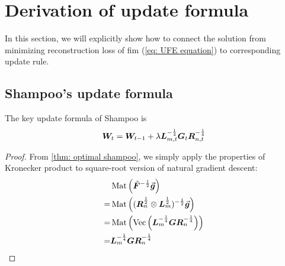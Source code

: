\section{Derivation of update formula}
\label{app: derivation of update formula}
In this section, we will explicitly show how to connect the solution from minimizing reconstruction loss of \gls{fim} (\cref{eq: UFE equation}) to corresponding update rule. 

\subsection{Shampoo's update formula}
\label{subapp: Shampoo update formula}
The key update formula of Shampoo is 
\begin{align*}
    {\bm{W}}_t = {\bm{W}}_{t-1} + \lambda {\bm{L}}_{m,t}^{-\frac{1}{4}}{\bm{G}}_t{\bm{R}}_{n,t}^{-\frac{1}{4}}
\end{align*}
\begin{proof}
    From \cref{thm: optimal shampoo}, we simply apply the properties of Kronecker product to square-root version of natural gradient descent:
    \begin{align*}
        &\operatorname{Mat}\left(\tilde{\bm{F}}^{-\frac{1}{2}}\vec{\bm{g}}\right)\\
        =&\operatorname{Mat}\left(({\bm{R}}_{n}^{\frac{1}{2}}\otimes {\bm{L}}_{m}^{\frac{1}{2}})^{-\frac{1}{2}}\vec{\bm{g}}\right)\\
        =& \operatorname{Mat}\left(\operatorname{Vec}\left({\bm{L}}_{m}^{-\frac{1}{4}}{\bm{G}}{\bm{R}}_{n}^{-\frac{1}{4}}\right)\right)\\
        =& {\bm{L}}_{m}^{-\frac{1}{4}}{\bm{G}}{\bm{R}}_{n}^{-\frac{1}{4}}
    \end{align*}
\end{proof}

